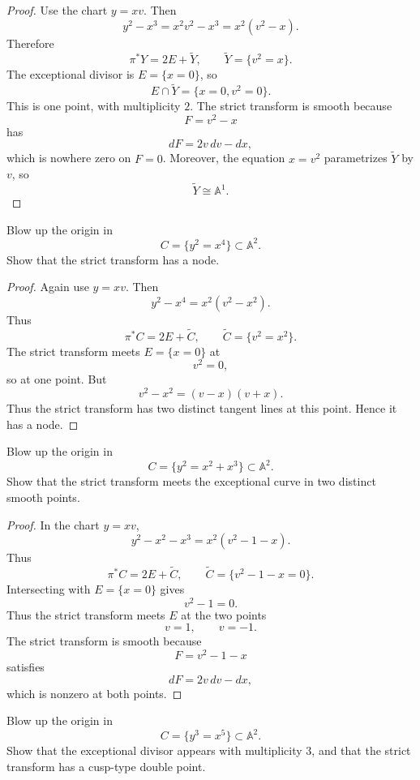 \begin{proof}
Use the chart $y=xv$. Then
$$
y^2-x^3=x^2v^2-x^3=x^2(v^2-x).
$$
Therefore
$$
\pi^*Y=2E+\widetilde Y,
\qquad
\widetilde Y=\{v^2=x\}.
$$
The exceptional divisor is $E=\{x=0\}$, so
$$
E\cap \widetilde Y=\{x=0,v^2=0\}.
$$
This is one point, with multiplicity $2$.
The strict transform is smooth because
$$
F=v^2-x
$$
has
$$
dF=2v\,dv-dx,
$$
which is nowhere zero on $F=0$.
Moreover, the equation $x=v^2$ parametrizes
$\widetilde Y$ by $v$, so
$$
\widetilde Y\cong \mathbb{A}^1.
$$
\end{proof}

\begin{exercise}
\label{exercise-blow-up-tacnode}
Blow up the origin in
$$
C=\{y^2=x^4\}\subset \mathbb{A}^2.
$$
Show that the strict transform has a node.
\end{exercise}

\begin{proof}
Again use $y=xv$. Then
$$
y^2-x^4=x^2(v^2-x^2).
$$
Thus
$$
\pi^*C=2E+\widetilde C,
\qquad
\widetilde C=\{v^2=x^2\}.
$$
The strict transform meets $E=\{x=0\}$ at
$$
v^2=0,
$$
so at one point. But
$$
v^2-x^2=(v-x)(v+x).
$$
Thus the strict transform has two distinct tangent
lines at this point. Hence it has a node.
\end{proof}

\begin{exercise}
\label{exercise-blow-up-node}
Blow up the origin in
$$
C=\{y^2=x^2+x^3\}\subset \mathbb{A}^2.
$$
Show that the strict transform meets the exceptional
curve in two distinct smooth points.
\end{exercise}

\begin{proof}
In the chart $y=xv$,
$$
y^2-x^2-x^3=x^2(v^2-1-x).
$$
Thus
$$
\pi^*C=2E+\widetilde C,
\qquad
\widetilde C=\{v^2-1-x=0\}.
$$
Intersecting with $E=\{x=0\}$ gives
$$
v^2-1=0.
$$
Thus the strict transform meets $E$ at the two points
$$
v=1,
\qquad
v=-1.
$$
The strict transform is smooth because
$$
F=v^2-1-x
$$
satisfies
$$
dF=2v\,dv-dx,
$$
which is nonzero at both points.
\end{proof}

\begin{exercise}
\label{exercise-blow-up-y3-x5}
Blow up the origin in
$$
C=\{y^3=x^5\}\subset \mathbb{A}^2.
$$
Show that the exceptional divisor appears with
multiplicity $3$, and that the strict transform has a
cusp-type double point.
\end{exercise}

